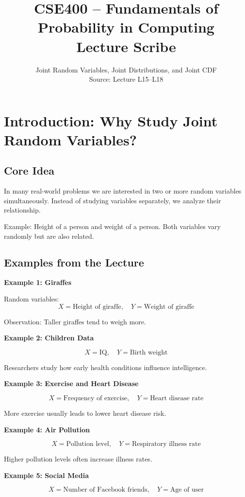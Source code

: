 \documentclass[12pt,a4paper]{article}
\title{CSE400 -- Fundamentals of Probability in Computing\\
Lecture Scribe}
\author{Joint Random Variables, Joint Distributions, and Joint CDF\\
Source: Lecture L15--L18}
\date{}
\begin{document}
\maketitle

\section{Introduction: Why Study Joint Random Variables?}

\subsection{Core Idea}

In many real-world problems we are interested in two or more random variables simultaneously. Instead of studying variables separately, we analyze their relationship.

Example: Height of a person and weight of a person.  
Both variables vary randomly but are also related.

\subsection{Examples from the Lecture}

\textbf{Example 1: Giraffes}

Random variables:
\[
X = \text{Height of giraffe}, \quad Y = \text{Weight of giraffe}
\]

Observation: Taller giraffes tend to weigh more.

\textbf{Example 2: Children Data}

\[
X = \text{IQ}, \quad Y = \text{Birth weight}
\]

Researchers study how early health conditions influence intelligence.

\textbf{Example 3: Exercise and Heart Disease}

\[
X = \text{Frequency of exercise}, \quad Y = \text{Heart disease rate}
\]

More exercise usually leads to lower heart disease risk.

\textbf{Example 4: Air Pollution}

\[
X = \text{Pollution level}, \quad Y = \text{Respiratory illness rate}
\]

Higher pollution levels often increase illness rates.

\textbf{Example 5: Social Media}

\[
X = \text{Number of Facebook friends}, \quad Y = \text{Age of user}
\]
\end{document}
